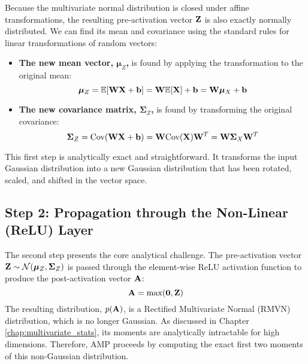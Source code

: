 Because the multivariate normal distribution is closed under affine transformations, the resulting pre-activation vector $\mathbf{Z}$ is also exactly normally distributed. We can find its mean and covariance using the standard rules for linear transformations of random vectors:
\begin{itemize}
    \item \textbf{The new mean vector, $\boldsymbol{\mu}_Z$,} is found by applying the transformation to the original mean:
    \begin{equation}
        \boldsymbol{\mu}_Z = \mathbb{E}[\mathbf{W}\mathbf{X} + \mathbf{b}] = \mathbf{W}\mathbb{E}[\mathbf{X}] + \mathbf{b} = \mathbf{W}\boldsymbol{\mu}_X + \mathbf{b}
    \end{equation}
    \item \textbf{The new covariance matrix, $\boldsymbol{\Sigma}_Z$,} is found by transforming the original covariance:
    \begin{equation}
        \boldsymbol{\Sigma}_Z = \text{Cov}(\mathbf{W}\mathbf{X} + \mathbf{b}) = \mathbf{W}\text{Cov}(\mathbf{X})\mathbf{W}^T = \mathbf{W}\boldsymbol{\Sigma}_X\mathbf{W}^T
    \end{equation}
\end{itemize}
This first step is analytically exact and straightforward. It transforms the input Gaussian distribution into a new Gaussian distribution that has been rotated, scaled, and shifted in the vector space.

\subsection{Step 2: Propagation through the Non-Linear (ReLU) Layer}
The second step presents the core analytical challenge. The pre-activation vector $\mathbf{Z} \sim \mathcal{N}(\boldsymbol{\mu}_Z, \boldsymbol{\Sigma}_Z)$ is passed through the element-wise ReLU activation function to produce the post-activation vector $\mathbf{A}$:
\begin{equation}
    \mathbf{A} = \max(\mathbf{0}, \mathbf{Z})
\end{equation}
The resulting distribution, $p(\mathbf{A})$, is a Rectified Multivariate Normal (RMVN) distribution, which is no longer Gaussian. As discussed in Chapter \ref{chap:multivariate_stats}, its moments are analytically intractable for high dimensions. Therefore, AMP proceeds by computing the exact first two moments of this non-Gaussian distribution.

